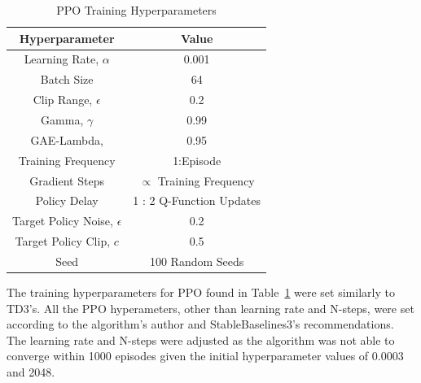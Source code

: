 \documentclass[10pt,twocolumn,letterpaper]{article}
\begin{document}
%
%
\begin{table}[t]
        \caption{PPO Training Hyperparameters}
        \vspace{-4mm}
        \label{tab:training_hyperameters_PPO}
        \begin{center}
        \begin{tabular}{|c||c|}
        \hline
        Hyperparameter                  & Value                           \\
        \hline
        Learning Rate, $\alpha$         & 0.001                           \\
        Batch Size                      & 64                              \\
        Clip Range, $\epsilon $         & 0.2                             \\
        Gamma, $\gamma$                 & 0.99                            \\
        GAE-Lambda,                     & 0.95                            \\
        Training Frequency              & 1:Episode                       \\
        Gradient Steps                  & $\propto$ Training Frequency    \\
        Policy Delay                    & 1 : 2 Q-Function Updates        \\
        Target Policy Noise, $\epsilon$ & 0.2                             \\
        Target Policy Clip, $c$         & 0.5                             \\
        Seed                            & 100 Random Seeds                \\
        \hline
        \end{tabular}
        \end{center}
        \vspace{-5mm}
\end{table}
%

The training hyperparameters for PPO found in Table~\ref{tab:training_hyperameters_PPO} were set similarly to TD3's. All the PPO hyperameters, other than learning rate and N-steps, were set according to the algorithm's author and StableBaselines3's recommendations.
The learning rate and N-steps were adjusted as the algorithm was not able to converge within 1000 episodes given the initial hyperparameter values of 0.0003 and 2048. 

\end{document}
